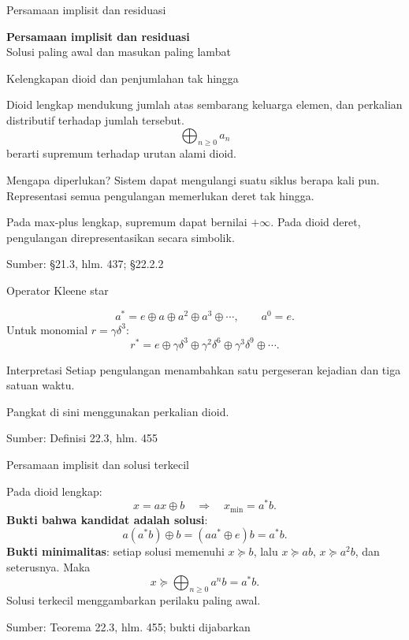 \documentclass[aspectratio=169,11pt]{beamer}
\newcommand{\source}[1]{%
    \vfill
    \hfill{\tiny\color{gray}Sumber: #1}
}
\begin{document}
\begin{frame}{Persamaan implisit dan residuasi}
\begin{center}{\LARGE\bfseries\color{AcademicBlue}Persamaan implisit dan residuasi}\\[8mm]Solusi paling awal dan masukan paling lambat\end{center}
\end{frame}
\begin{frame}{Kelengkapan dioid dan penjumlahan tak hingga}


Dioid lengkap mendukung jumlah atas sembarang keluarga elemen,
dan perkalian distributif terhadap jumlah tersebut.
\[
\bigoplus_{n\ge0}a_n
\]
berarti supremum terhadap urutan alami dioid.
\begin{block}{Mengapa diperlukan?}
Sistem dapat mengulangi suatu siklus berapa kali pun.
Representasi semua pengulangan memerlukan deret tak hingga.
\end{block}
Pada max-plus lengkap, supremum dapat bernilai $+\infty$.
Pada dioid deret, pengulangan direpresentasikan secara simbolik.

\source{\S21.3, hlm. 437; \S22.2.2}

\end{frame}
\begin{frame}{Operator Kleene star}


\[
a^*=e\oplus a\oplus a^2\oplus a^3\oplus\cdots,
\qquad a^0=e.
\]
Untuk monomial $r=\gamma\delta^3$:
\[
r^*=e\oplus\gamma\delta^3
\oplus\gamma^2\delta^6\oplus\gamma^3\delta^9\oplus\cdots.
\]
\begin{exampleblock}{Interpretasi}
Setiap pengulangan menambahkan satu pergeseran kejadian dan tiga satuan waktu.
\end{exampleblock}
Pangkat di sini menggunakan perkalian dioid.

\source{Definisi 22.3, hlm. 455}

\end{frame}
\begin{frame}{Persamaan implisit dan solusi terkecil}


Pada dioid lengkap:
\[
x=ax\oplus b
\quad\Longrightarrow\quad
x_{\min}=a^*b.
\]
\textbf{Bukti bahwa kandidat adalah solusi}:
\[
a(a^*b)\oplus b=(aa^*\oplus e)b=a^*b.
\]
\textbf{Bukti minimalitas}: setiap solusi memenuhi $x\succeq b$, lalu
$x\succeq ab$, $x\succeq a^2b$, dan seterusnya. Maka
\[
x\succeq\bigoplus_{n\ge0}a^nb=a^*b.
\]
Solusi terkecil menggambarkan perilaku paling awal.

\source{Teorema 22.3, hlm. 455; bukti dijabarkan}

\end{frame}
\end{document}
